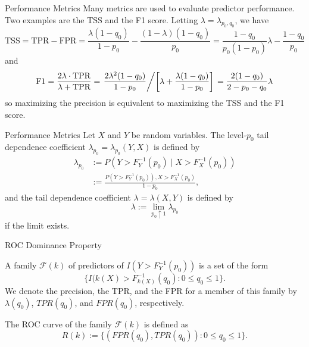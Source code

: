 \documentclass{beamer}
\begin{document}
\begin{frame}{Performance Metrics}
    Many metrics are used to evaluate predictor performance. Two examples are the TSS and the F1 score. Letting $\lambda = \lambda_{p_0, q_0}$, we have
    \[
    \text{TSS} = \text{TPR} - \text{FPR} = \frac{\lambda(1 - q_0)}{1 - p_0} - \frac{(1 - \lambda)(1 - q_0)}{p_0} = \frac{1 - q_0}{p_0(1 - p_0)}\lambda - \frac{1 - q_0}{p_0}
    \]
    and
    \[
    \text{F1} = \frac{2\lambda \cdot \text{TPR}}{\lambda + \text{TPR}} = \left.\frac{2\lambda^2(1 - q_0)}{1 - p_0} \middle/ \left[\lambda + \frac{\lambda(1 - q_0)}{1 - p_0}\right]\right. = \frac{2(1 - q_0)}{2 - p_0 - q_0}\lambda
    \]
    so maximizing the precision is equivalent to maximizing the TSS and the F1 score.
\end{frame}

\begin{frame}{Performance Metrics}
    Let $X$ and $Y$ be random variables. The level-$p_0$ tail dependence coefficient $\lambda_{p_0} = \lambda_{p_0}(Y, X)$ is defined by
    \begin{align*}
        \lambda_{p_0} &:= P(Y > F_Y^{-1}(p_0) \mid X > F_X^{-1}(p_0)) \\
        &:= \frac{P(Y > F_Y^{-1}(p_0)), X > F_X^{-1}(p_0)}{1 - p_0},
    \end{align*}
    and the tail dependence coefficient $\lambda = \lambda(X, Y)$ is defined by
    \[
    \lambda := \lim_{p_0 \uparrow 1} \lambda_{p_0}
    \]
    if the limit exists.
\end{frame}

\begin{frame}{ROC Dominance Property}
    \begin{definition}
        A family $\mathcal{F}(k)$ of predictors of $I(Y > F_Y^{-1}(p_0))$ is a set of the form
        \[
        \{I(k(X) > F_{k(X)}^{-1}(q_0) : 0 \le q_0 \le 1\}.
        \]
        We denote the precision, the TPR, and the FPR for a member of this family by $\lambda(q_0)$, $TPR(q_0)$, and $FPR(q_0)$, respectively.
    \end{definition}

    \begin{definition}
        The ROC curve of the family $\mathcal{F}(k)$ is defined as 
        \[
        R(k) := \{(FPR(q_0), TPR(q_0)) : 0 \le q_0 \le 1\}.
        \]
    \end{definition}    
\end{frame}
\end{document}
